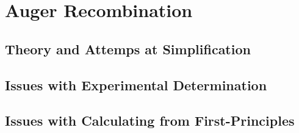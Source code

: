 \section{Auger Recombination}\label{auger-recombination}

\subsection{Theory and Attemps at
Simplification}\label{theory-and-attemps-at-simplification}

\subsection{Issues with Experimental
Determination}\label{issues-with-experimental-determination}

\subsection{Issues with Calculating from
First-Principles}\label{issues-with-calculating-from-first-principles}
